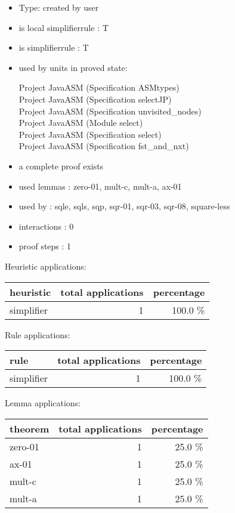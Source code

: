 \documentclass[a4paper]{article}
\begin{document}
\begin{itemize}

\item Type: created by user

\item is local simplifierrule : T
\item is simplifierrule : T
\item used by units in proved state:

Project JavaASM (Specification ASMtypes) \\
Project JavaASM (Specification selectJP) \\
Project JavaASM (Specification unvisited\_nodes) \\
Project JavaASM (Module select) \\
Project JavaASM (Specification select) \\
Project JavaASM (Specification fst\_and\_nxt)
\item       a complete proof exists
\item       used lemmas  : zero-01, mult-c, mult-a, ax-01
\item       used by      : sqle, sqls, sqp, sqr-01, sqr-03, sqr-08, square-less
\item       interactions : 0
\item       proof steps  : 1
\end{itemize}

\medskip


Heuristic applications:

\begin{supertabular}{l|r|r}
heuristic	& total applications & percentage \\ \hline
simplifier & 1 & 100.0 \% \\

\end{supertabular}

Rule applications:

\begin{supertabular}{l|r|r}
rule	        & total applications & percentage \\ \hline
simplifier & 1 & 100.0 \% \\

\end{supertabular}

Lemma applications:

\begin{supertabular}{l|r|r}
theorem	        & total applications & percentage \\ \hline
zero-01 & 1 & 25.0 \% \\
ax-01 & 1 & 25.0 \% \\
mult-c & 1 & 25.0 \% \\
mult-a & 1 & 25.0 \% \\

\end{supertabular}
\end{document}
